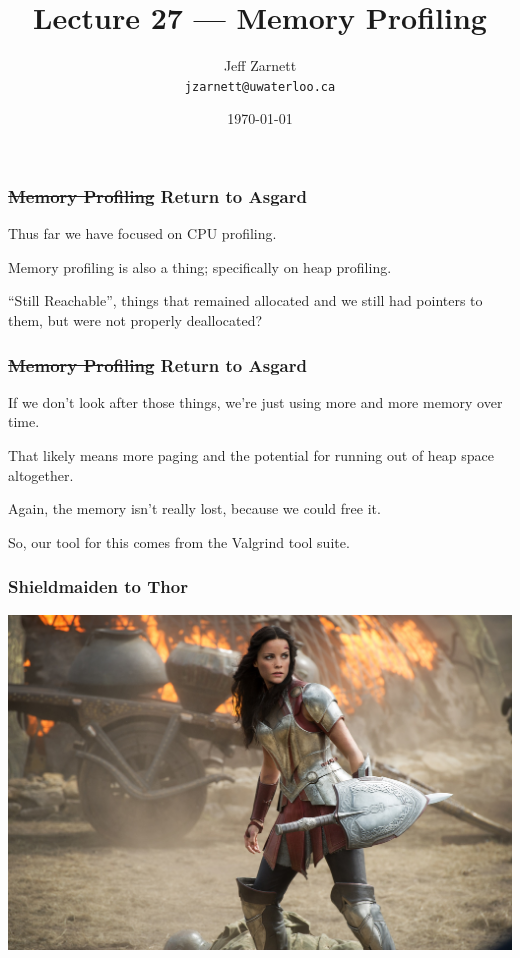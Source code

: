 
\usepackage{soul}

\title{Lecture 27 --- Memory Profiling }

\author{Jeff Zarnett \\ \small \texttt{jzarnett@uwaterloo.ca}}
\date{\today}




\begin{frame}
  \titlepage

 \end{frame}



\begin{frame}
\frametitle{\st{Memory Profiling} Return to Asgard}

Thus far we have focused on CPU profiling. 

Memory profiling is also a thing; specifically on heap profiling.

``Still Reachable'', things that remained allocated and we still had pointers to them, but were not properly deallocated?

\end{frame}



\begin{frame}
\frametitle{\st{Memory Profiling} Return to Asgard}

If we don't look after those things, we're just using more and more memory over time. 

That likely means more paging and the potential for running out of heap space altogether. 

Again, the memory isn't really lost, because we could free it.

So, our tool for this comes from the Valgrind tool suite.

\end{frame}


\begin{frame}
\frametitle{Shieldmaiden to Thor}

\begin{center}
	\includegraphics[width=\textwidth]{images/Sif.jpg}
\end{center}

\end{frame}



